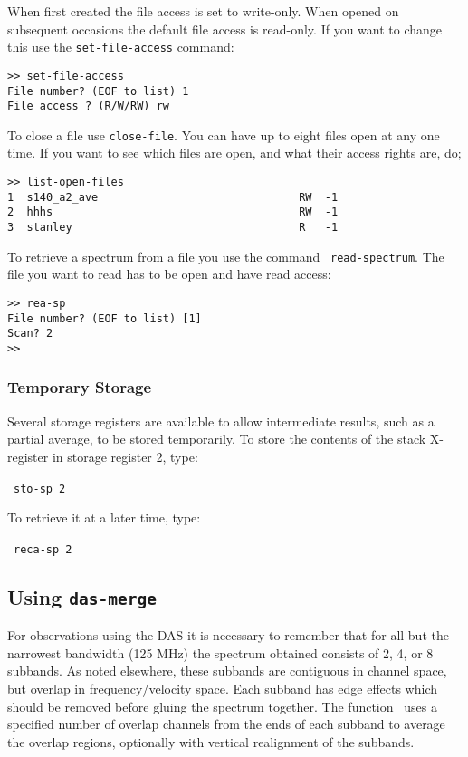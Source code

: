 When first created the file access is set to write-only. When opened on 
subsequent occasions the default file access is read-only. If you want to 
change this use the {\tt set-file-access} command:

\begin{verbatim}
>> set-file-access
File number? (EOF to list) 1
File access ? (R/W/RW) rw
\end{verbatim}

To close a file use {\tt close-file}.  You can have up to eight files open
at any one time.  If you want to see which files are open, and what their
access rights are, do;

\begin{verbatim}
>> list-open-files
1  s140_a2_ave                               RW  -1
2  hhhs                                      RW  -1
3  stanley                                   R   -1
\end{verbatim}

To retrieve a spectrum from a file you use the command {\tt
read-spectrum}.  The file you want to read has to be open and have
read access: \eg

\begin{verbatim}
>> rea-sp
File number? (EOF to list) [1] 
Scan? 2
>> 
\end{verbatim}

\subsubsection{Temporary Storage}
\label{sec:temp-storage}
Several storage registers are available to allow intermediate results,
such as a partial average, to be stored temporarily. To store the
contents of the stack X-register in storage register 2, type:

\SP\ {\tt sto-sp 2}

To retrieve it at a later time, type:

\SP\ {\tt reca-sp 2}


\subsection{Using {\tt das-merge}}
\label{sec:das-merge}
For observations using the DAS it is necessary to remember that for
all but the narrowest bandwidth (125 MHz) the spectrum obtained
consists of 2, 4, or 8 subbands. As noted elsewhere, these subbands
are contiguous in channel space, but overlap in frequency/velocity
space. Each subband has edge effects which should be removed before
gluing the spectrum together. The function \dm\ uses a specified
number of overlap channels from the ends of each subband to average
the overlap regions, optionally with vertical realignment of the
subbands.

